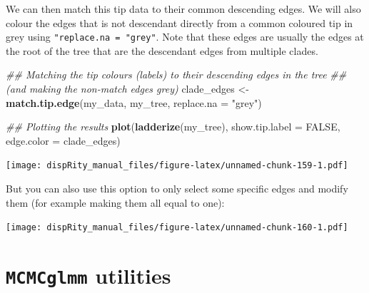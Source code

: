 \documentclass[
]{book}
\newenvironment{Shaded}{\begin{snugshade}}{\end{snugshade}}
\newcommand{\CommentTok}[1]{\textcolor[rgb]{0.56,0.35,0.01}{\textit{#1}}}
\newcommand{\DataTypeTok}[1]{\textcolor[rgb]{0.13,0.29,0.53}{#1}}
\newcommand{\DecValTok}[1]{\textcolor[rgb]{0.00,0.00,0.81}{#1}}
\newcommand{\KeywordTok}[1]{\textcolor[rgb]{0.13,0.29,0.53}{\textbf{#1}}}
\newcommand{\NormalTok}[1]{#1}
\newcommand{\OperatorTok}[1]{\textcolor[rgb]{0.81,0.36,0.00}{\textbf{#1}}}
\newcommand{\OtherTok}[1]{\textcolor[rgb]{0.56,0.35,0.01}{#1}}
\newcommand{\StringTok}[1]{\textcolor[rgb]{0.31,0.60,0.02}{#1}}
\begin{document}
We can then match this tip data to their common descending edges.
We will also colour the edges that is not descendant directly from a common coloured tip in grey using \texttt{"replace.na\ =\ "grey"}.
Note that these edges are usually the edges at the root of the tree that are the descendant edges from multiple clades.

\begin{Shaded}
\begin{Highlighting}[]
\CommentTok{\#\# Matching the tip colours (labels) to their descending edges in the tree}
\CommentTok{\#\# (and making the non{-}match edges grey)}
\NormalTok{clade\_edges \textless{}{-}}\StringTok{ }\KeywordTok{match.tip.edge}\NormalTok{(my\_data, my\_tree, }\DataTypeTok{replace.na =} \StringTok{"grey"}\NormalTok{)}

\CommentTok{\#\# Plotting the results}
\KeywordTok{plot}\NormalTok{(}\KeywordTok{ladderize}\NormalTok{(my\_tree), }\DataTypeTok{show.tip.label =} \OtherTok{FALSE}\NormalTok{, }\DataTypeTok{edge.color =}\NormalTok{ clade\_edges)}
\end{Highlighting}
\end{Shaded}

\texttt{[image: dispRity\_manual\_files/figure-latex/unnamed-chunk-159-1.pdf]}

But you can also use this option to only select some specific edges and modify them (for example making them all equal to one):

\begin{Shaded}
\end{Shaded}

\texttt{[image: dispRity\_manual\_files/figure-latex/unnamed-chunk-160-1.pdf]}

\hypertarget{MCMCglmm-utilities}{%
\section{\texorpdfstring{\texttt{MCMCglmm} utilities}{MCMCglmm utilities}}\label{MCMCglmm-utilities}}
\end{document}
